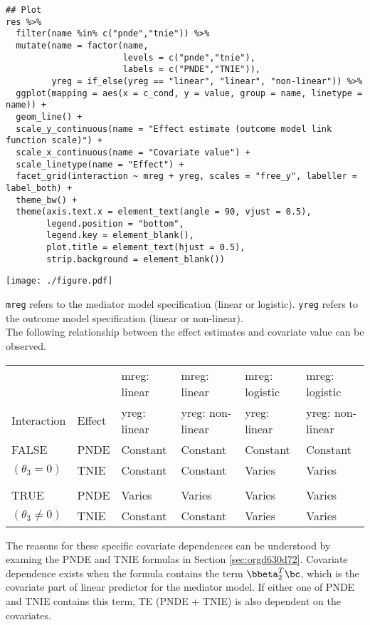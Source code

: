 \documentclass[10pt]{article}
\begin{document}
\begin{verbatim}
## Plot
res %>%
  filter(name %in% c("pnde","tnie")) %>%
  mutate(name = factor(name,
                       levels = c("pnde","tnie"),
                       labels = c("PNDE","TNIE")),
         yreg = if_else(yreg == "linear", "linear", "non-linear")) %>%
  ggplot(mapping = aes(x = c_cond, y = value, group = name, linetype = name)) +
  geom_line() +
  scale_y_continuous(name = "Effect estimate (outcome model link function scale)") +
  scale_x_continuous(name = "Covariate value") +
  scale_linetype(name = "Effect") +
  facet_grid(interaction ~ mreg + yreg, scales = "free_y", labeller = label_both) +
  theme_bw() +
  theme(axis.text.x = element_text(angle = 90, vjust = 0.5),
        legend.position = "bottom",
        legend.key = element_blank(),
        plot.title = element_text(hjust = 0.5),
        strip.background = element_blank())
\end{verbatim}

\begin{center}
\texttt{[image: ./figure.pdf]}
\end{center}

\normalsize

\texttt{mreg} refers to the mediator model specification (linear or logistic). \texttt{yreg} refers to the outcome model specification (linear or non-linear).\\

The following relationship between the effect estimates and covariate value can be observed.

\begin{center}
\begin{tabular}{llllll}
 &  & mreg: linear & mreg: linear & mreg: logistic & mreg: logistic\\
Interaction & Effect & yreg: linear & yreg: non-linear & yreg: linear & yreg: non-linear\\
\hline
FALSE & PNDE & Constant & Constant & Constant & Constant\\
\((\theta_{3} = 0)\) & TNIE & Constant & Constant & Varies & Varies\\
 &  &  &  &  & \\
TRUE & PNDE & Varies & Varies & Varies & Varies\\
\((\theta_{3} \ne 0)\) & TNIE & Constant & Constant & Varies & Varies\\
\end{tabular}
\end{center}

The reasons for these specific covariate dependences can be understood by examing the PNDE and TNIE formulas in Section \ref{sec:orgd630d72}. Covariate dependence exists when the formula contains the term \(\bbeta_{2}^{T}\bc\), which is the covariate part of linear predictor for the mediator model. If either one of PNDE and TNIE contains this term, TE (PNDE + TNIE) is also dependent on the covariates.\\
\end{document}

